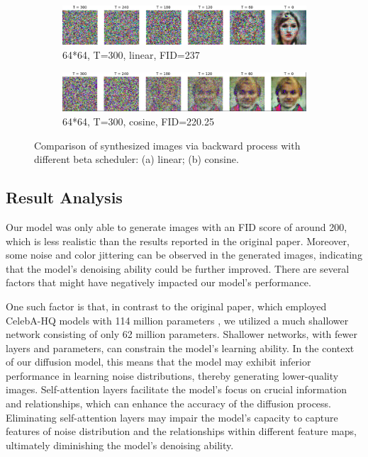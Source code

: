 \documentclass[letterpaper]{article} %
\begin{document}
\begin{figure}[htbp]
    \centering
    \begin{subfigure}{0.45\textwidth}
        \includegraphics[width=\textwidth]{f4.jpg}
        \caption{64*64, T=300, linear, FID=237}
        \label{fig:figure4a}
    \end{subfigure}
    \hfill
    \begin{subfigure}{0.45\textwidth}
        \includegraphics[width=\textwidth]{f9.png} %
        \caption{64*64, T=300, cosine, FID=220.25} %
        \label{fig:figure4b}
    \end{subfigure}
    \caption{Comparison of synthesized images via backward process with different beta scheduler: (a) linear; (b) consine.}
    \label{fig:figure4}
\end{figure}

\subsection{Result Analysis}
Our model was only able to generate images with an FID score of around 200, which is less realistic than the results reported in the original paper. Moreover, some noise and color jittering can be observed in the generated images, indicating that the model's denoising ability could be further improved. There are several factors that might have negatively impacted our model's performance.

One such factor is that, in contrast to the original paper, which employed CelebA-HQ models with 114 million parameters \cite{2020denoising}, we utilized a much shallower network consisting of only 62 million parameters. Shallower networks, with fewer layers and parameters, can constrain the model's learning ability. In the context of our diffusion model, this means that the model may exhibit inferior performance in learning noise distributions, thereby generating lower-quality images. Self-attention layers facilitate the model's focus on crucial information and relationships, which can enhance the accuracy of the diffusion process. Eliminating self-attention layers may impair the model's capacity to capture features of noise distribution and the relationships within different feature maps, ultimately diminishing the model's denoising ability.
\end{document}
